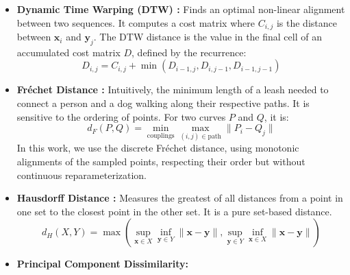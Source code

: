 \documentclass[a4paper,12pt]{article}
\begin{document}
\begin{itemize}
    \item \textbf{Dynamic Time Warping (DTW) \cite{SalvadorChan2007}:} Finds an optimal non-linear alignment between two sequences. It computes a cost matrix where $C_{i,j}$ is the distance between $\mathbf{x}_i$ and $\mathbf{y}_j$. The DTW distance is the value in the final cell of an accumulated cost matrix $D$, defined by the recurrence:
    \begin{equation}
        D_{i,j} = C_{i,j} + \min(D_{i-1, j}, D_{i, j-1}, D_{i-1, j-1})
    \end{equation}
    \item \textbf{Fréchet Distance \cite{Denaxas2023} \cite{EiterMannila1994}:} Intuitively, the minimum length of a leash needed to connect a person and a dog walking along their respective paths. It is sensitive to the ordering of points. For two curves $P$ and $Q$, it is:
        \begin{equation}
            d_F(P, Q) = \min_{\text{couplings}} \max_{(i, j) \in \text{path}} \| P_i - Q_j \|
        \end{equation}
        In this work, we use the discrete Fréchet distance, using monotonic alignments of the sampled points, respecting their order but without continuous reparameterization.
    \item \textbf{Hausdorff Distance \cite{SciPyDirectedHausdorff}:} Measures the greatest of all distances from a point in one set to the closest point in the other set. It is a pure set-based distance.
    \begin{equation}
        d_H(X, Y) = \max \left( \sup_{\mathbf{x} \in X} \inf_{\mathbf{y} \in Y} \|\mathbf{x}-\mathbf{y}\|, \sup_{\mathbf{y} \in Y} \inf_{\mathbf{x} \in X} \|\mathbf{x}-\mathbf{y}\| \right)
    \end{equation}
    \item \textbf{Principal Component Dissimilarity:}
\end{itemize}
\end{document}
